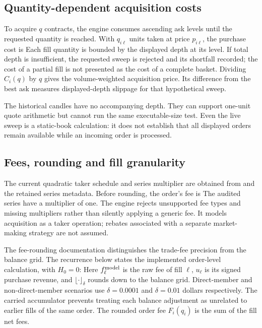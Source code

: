 \subsection{Quantity-dependent acquisition costs}
To acquire $q$ contracts, the engine consumes ascending ask levels until the requested quantity is reached. With $q_{i\ell}$ units taken at price $p_{i\ell}$, the purchase cost is
Each fill quantity is bounded by the displayed depth at its level. If total depth is insufficient, the requested sweep is rejected and its shortfall recorded; the cost of a partial fill is not presented as the cost of a complete basket. Dividing $C_i(q)$ by $q$ gives the volume-weighted acquisition price. Its difference from the best ask measures displayed-depth slippage for that hypothetical sweep.

The historical candles have no accompanying depth. They can support one-unit quote arithmetic but cannot run the same executable-size test. Even the live sweep is a static-book calculation: it does not establish that all displayed orders remain available while an incoming order is processed.

\subsection{Fees, rounding and fill granularity}
The current quadratic taker schedule and series multiplier are obtained from  and the retained series metadata. Before rounding, the order's fee is
The audited series have a multiplier of one. The engine rejects unsupported fee types and missing multipliers rather than silently applying a generic fee. It models acquisition as a taker operation; rebates associated with a separate market-making strategy are not assumed.

The  fee-rounding documentation distinguishes the trade-fee precision from the balance grid. The recurrence below states the implemented order-level calculation, with $H_0=0$:
Here $f_\ell^{\rm model}$ is the raw fee of fill $\ell$, $u_\ell$ is its signed purchase revenue, and $\lfloor\cdot\rfloor_\delta$ rounds down to the balance grid. Direct-member and non-direct-member scenarios use $\delta=0.0001$ and $\delta=0.01$ dollars respectively. The carried accumulator prevents treating each balance adjustment as unrelated to earlier fills of the same order. The rounded order fee $F_i(q_i)$ is the sum of the fill net fees.

